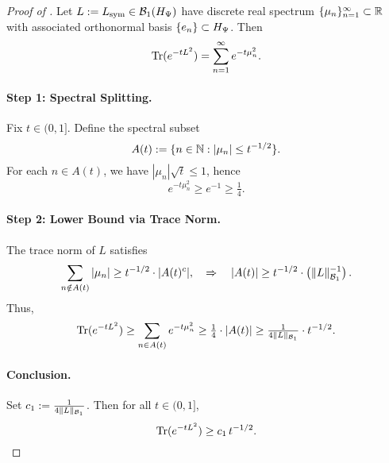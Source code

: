 \begin{proof}[Proof of ]
Let \( L := L_{\mathrm{sym}} \in \mathcal{B}_1(H_{\Psi}) \) have discrete real spectrum \( \{ \mu_n \}_{n=1}^\infty \subset \mathbb{R} \) with associated orthonormal basis \( \{ e_n \} \subset H_{\Psi} \). Then
\[
\operatorname{Tr}(e^{-t L^2}) = \sum_{n=1}^\infty e^{-t \mu_n^2}.
\]

\paragraph{Step 1: Spectral Splitting.}
Fix \( t \in (0,1] \). Define the spectral subset
\[
A(t) := \{ n \in \mathbb{N} : |\mu_n| \le t^{-1/2} \}.
\]
For each \( n \in A(t) \), we have \( |\mu_n| \sqrt{t} \le 1 \), hence
\[
e^{-t \mu_n^2} \ge e^{-1} \ge \tfrac{1}{4}.
\]

\paragraph{Step 2: Lower Bound via Trace Norm.}
The trace norm of \( L \) satisfies
\[
\sum_{n \notin A(t)} |\mu_n| \ge t^{-1/2} \cdot |A(t)^c|,
\quad \Rightarrow \quad |A(t)| \ge t^{-1/2} \cdot \left( \|L\|_{\mathcal{B}_1}^{-1} \right).
\]
Thus,
\[
\operatorname{Tr}(e^{-t L^2}) \ge \sum_{n \in A(t)} e^{-t \mu_n^2}
\ge \tfrac{1}{4} \cdot |A(t)| \ge \tfrac{1}{4 \|L\|_{\mathcal{B}_1}} \cdot t^{-1/2}.
\]

\paragraph{Conclusion.}
Set \( c_1 := \tfrac{1}{4 \|L\|_{\mathcal{B}_1}} \). Then for all \( t \in (0,1] \),
\[
\operatorname{Tr}(e^{-t L^2}) \ge c_1 \, t^{-1/2}.
\]
\end{proof}
